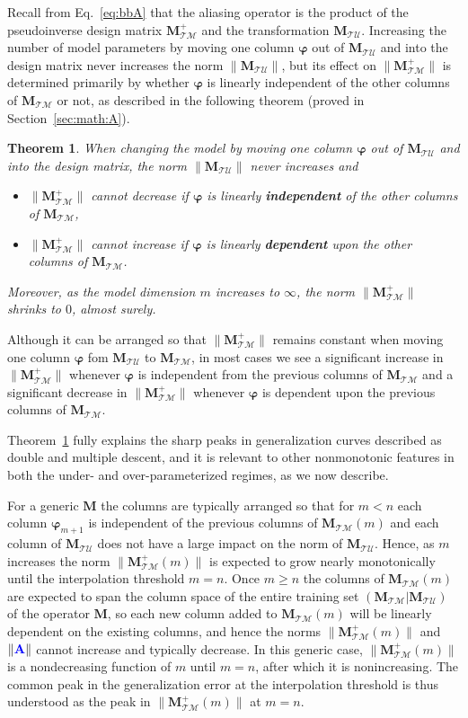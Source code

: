 \documentclass[twocolumn,aps,prx,superscriptaddress,10pt]{revtex4-2}
\newcommand{\0}{\bm{0}}
\newcommand{\bphi}{\boldsymbol{\varphi}}
\newcommand{\M}{\mathcal{M}} %
\newcommand{\T}{\mathcal{T}} %
\newcommand{\U}{\mathcal{U}} %
\newcommand{\bbA}{{\color{blue}{\mathbf{A}}}}  %
\newcommand{\bbM}{\mathbf{M}}
\newcommand{\MTM}{\bbM_{\T\M}}
\newcommand{\MTU}{\bbM_{\T\U}}
\newtheorem{theorem}{Theorem}[section]
\begin{document}
Recall from Eq.~\eqref{eq:bbA} that the aliasing operator is the product of the pseudoinverse design matrix $\MTM^+$ and the transformation $\MTU$.
Increasing the number of model parameters by moving one column $\bphi$ out of $\MTU$ and into the design matrix never increases the 
norm $\|\MTU\|$, but its effect on 
$\|\MTM^+\|$ is determined primarily by whether $\bphi$ 
is linearly independent of the other columns of $\MTM$ or not, as described in the following theorem (proved in Section~\ref{sec:math:A}).
\begin{theorem}\label{thm:main}
When changing the model by moving one column $\bphi$ out of $\MTU$ and into the design matrix,  the norm 
$\|\MTU\|$ never increases and 
\begin{itemize}
\item  $\|\MTM^+\|$ cannot decrease if $\bphi$ is linearly \textbf{independent} of the other columns of $\MTM$, 
\item $\|\MTM^+\|$ cannot increase if $\bphi$ is linearly \textbf{dependent} upon the other columns of $\MTM$.
\end{itemize}
Moreover, as the model dimension $m$ increases to $\infty$, the norm $\|\MTM^+\|$ shrinks to $0$, almost surely.
\end{theorem}
Although it can be arranged so that $\|\MTM^+\|$  remains constant when moving one column $\bphi$ fom $\MTU$ to $\MTM$, in most cases we see a significant  increase in $\|\MTM^+\|$ whenever $\bphi$ is independent from the previous columns of $\MTM$ and a significant decrease in $\|\MTM^+\|$ whenever $\bphi$ is dependent upon the previous columns of $\MTM$.

Theorem~\ref{thm:main} fully explains the sharp peaks in generalization curves described as double and multiple descent, and it is relevant to other nonmonotonic features in both the under- and over-parameterized regimes, as we now describe.

For a generic $\bbM$ the columns are typically arranged so that for $m < n$ each column $\bphi_{m+1}$ is independent of the previous columns of $\MTM(m)$ and each column of $\MTU$ does not have a large impact on the norm of $\MTU$.
Hence, as $m$ increases the norm $\|\MTM^+(m)\|$ is expected to grow nearly monotonically until the interpolation threshold $m=n$.  Once $m\ge n$ the columns of $\MTM(m)$ are expected to span the column space of the entire training set $(\MTM | \MTU)$ of the operator $\bbM$, so each new column added to  $\MTM(m)$ will be linearly dependent on the existing columns, and hence the norms $\|\MTM^+(m)\|$ and $\|\bbA\|$ cannot increase and typically decrease.  
In this generic case, $\|\MTM^+(m)\|$ is a nondecreasing function of $m$ until $m=n$, after which it is nonincreasing.
The common peak in the generalization error at the interpolation threshold is thus understood as the peak in $\|\MTM^+(m)\|$ at $m = n$.
\end{document}
